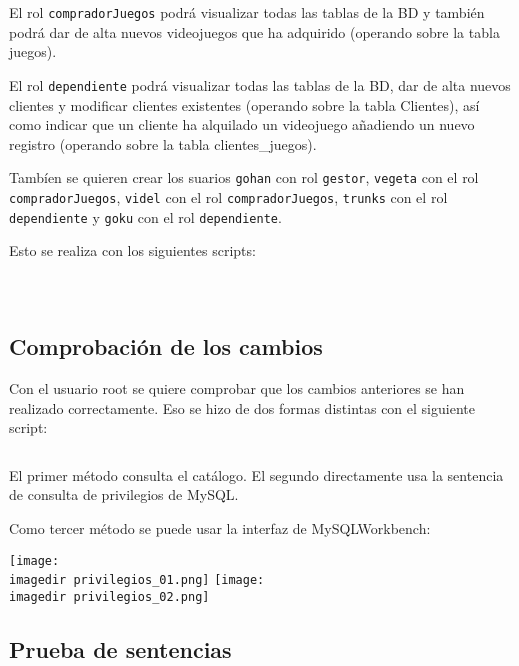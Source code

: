 \documentclass[a4paper, 11pt, oneside]{article} %
\newcommand{\scriptdir}{../scripts/} %
\newcommand{\imagedir}{../images/} %
\begin{document}
El rol \texttt{compradorJuegos} podrá visualizar todas las tablas de la BD y también podrá dar de alta nuevos videojuegos que ha adquirido (operando sobre la tabla juegos).

El rol \texttt{dependiente} podrá visualizar todas las tablas de la BD, dar de alta nuevos clientes y modificar clientes existentes (operando sobre la tabla Clientes), así como indicar que un cliente ha alquilado un videojuego añadiendo un nuevo registro (operando sobre la tabla clientes\_juegos).

Tambíen se quieren crear los suarios \texttt{gohan} con rol \texttt{gestor}, \texttt{vegeta} con el rol \texttt{compradorJuegos}, \texttt{videl} con el rol \texttt{compradorJuegos}, \texttt{trunks} con el rol \texttt{dependiente} y \texttt{goku} con el rol \texttt{dependiente}.

Esto se realiza con los siguientes scripts:

\inputminted{mysql}{\scriptdir scripts_roles/gestor.sql}

\inputminted{mysql}{\scriptdir scripts_roles/comprador_juegos_privileges_and_role_creation.sql}

\inputminted{mysql}{\scriptdir scripts_roles/dependiente_privileges_and_role_creation.sql}

\subsection{Comprobación de los cambios}

Con el usuario root se quiere comprobar que los cambios anteriores se han realizado correctamente. Eso se hizo de dos formas distintas con el siguiente script:

\inputminted{mysql}{\scriptdir scripts/scripts_consulta_privilegios/check_privileges.sql}

El primer método consulta el catálogo. El segundo directamente usa la sentencia de consulta de privilegios de MySQL.

Como tercer método se puede usar la interfaz de MySQLWorkbench:

\texttt{[image: \\imagedir privilegios\_01.png]}
\texttt{[image: \\imagedir privilegios\_02.png]}

\subsection{Prueba de sentencias}
\end{document}
